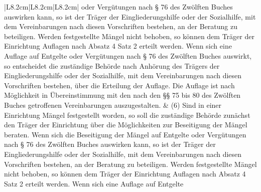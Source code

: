 \documentclass[10pt,a4paper,landscape]{article}
\begin{document}
\begin{longtable}{|L{8.2cm}|L{8.2cm}|L{8.2cm}|}
oder Vergütungen  nach \S{} 76 des  \newline Zwölften Buches auswirken kann, so ist der  \newline Träger der Eingliederungshilfe oder der  \newline Sozialhilfe, mit dem Vereinbarungen nach  \newline diesen Vorschriften bestehen, an der  \newline Beratung zu beteiligen. Werden  \newline festgestellte Mängel nicht behoben, so  \newline können dem Träger der Einrichtung  \newline Auflagen nach Absatz 4 Satz 2 erteilt  \newline werden. Wenn sich eine Auflage auf  \newline Entgelte oder Vergütungen  nach \S{} 76 des  \newline Zwölften Buches auswirkt, so entscheidet  \newline die zuständige Behörde nach Anhörung  \newline des Trägers der Eingliederungshilfe oder  \newline der Sozialhilfe, mit dem Vereinbarungen  \newline nach diesen Vorschriften bestehen, über  \newline die Erteilung der Auflage. Die Auflage ist  \newline nach Möglichkeit in Übereinstimmung mit  \newline den  nach den \S{}\S{} 75 bis 80 des Zwölften  \newline Buches getroffenen Vereinbarungen  \newline auszugestalten. & (6) Sind in einer Einrichtung Mängel  \newline festgestellt worden, so soll die zuständige  \newline Behörde zunächst den Träger der  \newline Einrichtung über die Möglichkeiten zur  \newline Beseitigung der Mängel beraten. Wenn  \newline sich die Beseitigung der Mängel auf  \newline Entgelte oder Vergütungen  nach \S{} 76 des  \newline Zwölften Buches auswirken kann, so ist der  \newline Träger der Eingliederungshilfe oder der  \newline Sozialhilfe, mit dem Vereinbarungen nach  \newline diesen Vorschriften bestehen, an der  \newline Beratung zu beteiligen. Werden  \newline festgestellte Mängel nicht behoben, so  \newline können dem Träger der Einrichtung  \newline Auflagen nach Absatz 4 Satz 2 erteilt  \newline werden. Wenn sich eine Auflage auf  \newline Entgelte 
\end{longtable}
\end{document}
